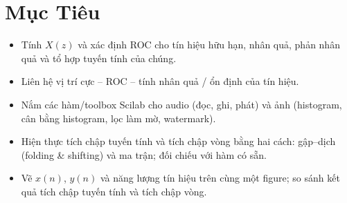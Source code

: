 \section{Mục Tiêu}
\begin{itemize}
    \item Tính $X(z)$ và xác định ROC cho tín hiệu hữu hạn, nhân quả, phản nhân quả và tổ hợp tuyến tính của chúng.
    \item Liên hệ vị trí cực -- ROC -- tính nhân quả / ổn định của tín hiệu.
    \item Nắm các hàm/toolbox Scilab cho audio (đọc, ghi, phát) và ảnh (histogram, cân bằng histogram, lọc làm mờ, watermark).
    \item Hiện thực tích chập tuyến tính và tích chập vòng bằng hai cách: gập--dịch (folding \& shifting) và ma trận; đối chiếu với hàm có sẵn.
    \item Vẽ $x(n)$, $y(n)$ và năng lượng tín hiệu trên cùng một figure; so sánh kết quả tích chập tuyến tính và tích chập vòng.
\end{itemize}
